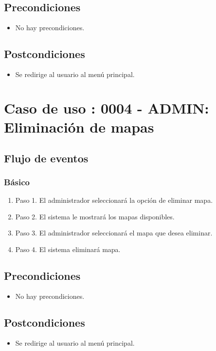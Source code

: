 \subsection{Precondiciones}
\begin{itemize}
\item No hay precondiciones.
\end{itemize}

\subsection{Postcondiciones}
\begin{itemize}
\item Se redirige al usuario al menú principal.
\end{itemize}


\section{Caso de uso : 0004 - ADMIN: Eliminación de mapas}\label{sec:uc0}
\subsection{Flujo de eventos}
\subsubsection{Básico}

\begin{enumerate}
\item Paso 1.
El administrador seleccionará la opción de eliminar mapa.
\item Paso 2.
El sistema le mostrará los mapas disponibles.
\item Paso 3.
El administrador seleccionará el mapa que desea eliminar.
\item Paso 4.
El sistema eliminará mapa.
\end{enumerate}

\subsection{Precondiciones}
\begin{itemize}
\item No hay precondiciones.
\end{itemize}

\subsection{Postcondiciones}
\begin{itemize}
\item Se redirige al usuario al menú principal.
\end{itemize}



